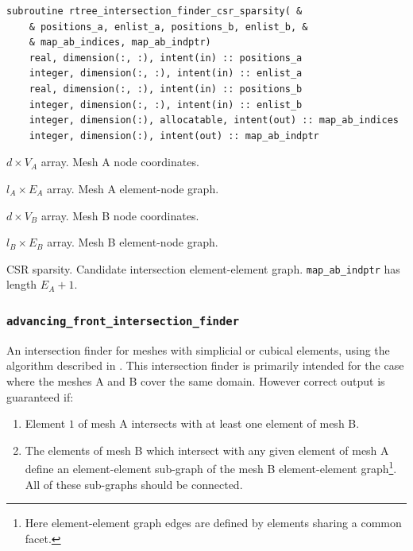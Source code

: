 \documentclass{article}
\begin{document}
\begin{lstlisting}[language=FORTRAN]
  subroutine rtree_intersection_finder_csr_sparsity( &
    & positions_a, enlist_a, positions_b, enlist_b, &
    & map_ab_indices, map_ab_indptr)
    real, dimension(:, :), intent(in) :: positions_a
    integer, dimension(:, :), intent(in) :: enlist_a
    real, dimension(:, :), intent(in) :: positions_b
    integer, dimension(:, :), intent(in) :: enlist_b
    integer, dimension(:), allocatable, intent(out) :: map_ab_indices
    integer, dimension(:), intent(out) :: map_ab_indptr
\end{lstlisting}

\begin{description}[font=\ttfamily\bfseries,leftmargin=2.2\parindent,labelindent=1.7\parindent,noitemsep]
  \item[positions\_a] $d \times V_A$ array. Mesh A node coordinates.
  \item[enlist\_a] $l_A \times E_A$ array. Mesh A element-node graph.
  \item[positions\_b] $d \times V_B$ array. Mesh B node coordinates.
  \item[enlist\_b] $l_B \times E_B$ array. Mesh B element-node graph.
  \item[map\_ab\_indices, map\_ab\_indptr] CSR sparsity. Candidate intersection
    element-element graph. \linebreak \verb+map_ab_indptr+ has length $E_A + 1$.
\end{description}

\subsubsection{\texttt{advancing\_front\_intersection\_finder}}

An intersection finder for meshes with simplicial or cubical elements, using
the algorithm described in \citet{farrell2011}
\citep[see also][]{gander2009,gander2013}. This intersection finder is primarily
intended for the case where the meshes A and B cover the same domain. However
correct output is guaranteed if:
\begin{enumerate}
  \item Element $1$ of mesh A intersects with at least one element of mesh B.
  \item The elements of mesh B which intersect with any given element of mesh A
        define an element-element sub-graph of the mesh B element-element
        graph\footnote{Here element-element graph edges are defined by elements
        sharing a common facet.}. All of these sub-graphs should be connected. 
\end{enumerate}
\end{document}
